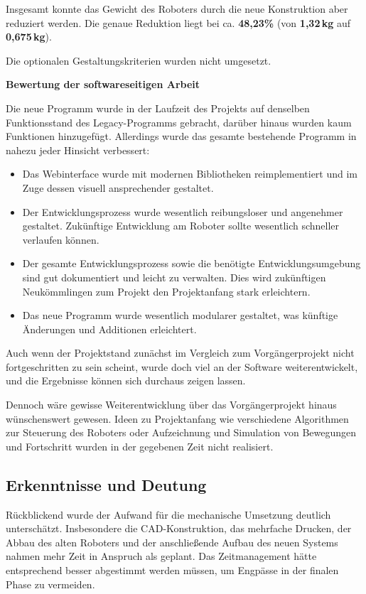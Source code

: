 Insgesamt konnte das Gewicht des Roboters durch die neue Konstruktion aber reduziert werden. Die genaue Reduktion liegt bei ca. \textbf{48{,}23\%} (von \textbf{1{,}32\,kg} auf \textbf{0{,}675\,kg}).

Die optionalen Gestaltungskriterien wurden nicht umgesetzt. 

\textbf{Bewertung der softwareseitigen Arbeit}

Die neue Programm wurde in der Laufzeit des Projekts auf denselben Funktionsstand des Legacy-Programms gebracht, darüber hinaus wurden kaum Funktionen hinzugefügt. Allerdings wurde das gesamte bestehende Programm in nahezu jeder Hinsicht verbessert:

\begin{itemize}
	\item Das Webinterface wurde mit modernen Bibliotheken reimplementiert und im Zuge dessen visuell ansprechender gestaltet.
	\item Der Entwicklungsprozess wurde wesentlich reibungsloser und angenehmer gestaltet. Zukünftige Entwicklung am Roboter sollte wesentlich schneller verlaufen können.
	\item Der gesamte Entwicklungsprozess sowie die benötigte Entwicklungsumgebung sind gut dokumentiert und leicht zu verwalten. Dies wird zukünftigen Neukömmlingen zum Projekt den Projektanfang stark erleichtern.
	\item Das neue Programm wurde wesentlich modularer gestaltet, was künftige Änderungen und Additionen erleichtert.
\end{itemize}

Auch wenn der Projektstand zunächst im Vergleich zum Vorgängerprojekt nicht fortgeschritten zu sein scheint, wurde doch viel an der Software weiterentwickelt, und die Ergebnisse können sich durchaus zeigen lassen.

Dennoch wäre gewisse Weiterentwicklung über das Vorgängerprojekt hinaus wünschenswert gewesen. Ideen zu Projektanfang wie verschiedene Algorithmen zur Steuerung des Roboters oder Aufzeichnung und Simulation von Bewegungen und Fortschritt wurden in der gegebenen Zeit nicht realisiert.

\subsection{Erkenntnisse und Deutung}

Rückblickend wurde der Aufwand für die mechanische Umsetzung deutlich unterschätzt. Insbesondere die CAD-Konstruktion, das mehrfache Drucken, der Abbau des alten Roboters und der anschließende Aufbau des neuen Systems nahmen mehr Zeit in Anspruch als geplant. Das Zeitmanagement hätte entsprechend besser abgestimmt werden müssen, um Engpässe in der finalen Phase zu vermeiden.

